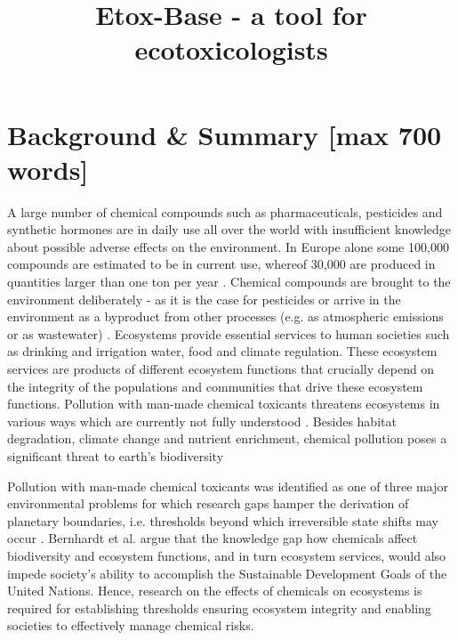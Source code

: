 \documentclass[english]{article}
\begin{document}
\title{Etox-Base - a tool for ecotoxicologists}


\begin{abstract}

\end{abstract}


\section*{Background \& Summary [max 700 words]}

A large number of chemical compounds such as pharmaceuticals, pesticides and synthetic hormones are in daily use all over the world with insufficient knowledge about possible adverse effects on the environment. In Europe alone some 100,000 compounds are estimated to be in current use, whereof 30,000 are produced in quantities larger than one ton per year \citep{breithaupt_costs_2006}. Chemical compounds are brought to the environment deliberately - as it is the case for pesticides or arrive in the environment as a byproduct from other processes (e.g. as atmospheric emissions or as wastewater) \citep{schwarzenbach_challenge_2006}. Ecosystems provide essential services to human societies such as drinking and irrigation water, food and climate regulation. These ecosystem services are products of different ecosystem functions that crucially depend on the integrity of the populations and communities that drive these ecosystem functions. Pollution with man-made chemical toxicants threatens ecosystems in various ways which are currently not fully understood \citep{steffen_anthropocene_2007}. Besides habitat degradation, climate change and nutrient enrichment, chemical pollution poses a significant threat to earth's biodiversity


Pollution with man-made chemical toxicants was identified as one of three major environmental problems for which research gaps hamper the derivation of planetary boundaries, i.e. thresholds beyond which irreversible state shifts may occur \citep{steffen_anthropocene_2007}. Bernhardt et al. \citet{bernhardt_synthetic_2017} argue that the knowledge gap how chemicals affect biodiversity and ecosystem functions, and in turn ecosystem services, would also impede society’s ability to accomplish the Sustainable Development Goals of the United Nations. Hence, research on the effects of chemicals on ecosystems is required for establishing thresholds ensuring ecosystem integrity and enabling societies to effectively manage chemical risks. 
\end{document}
